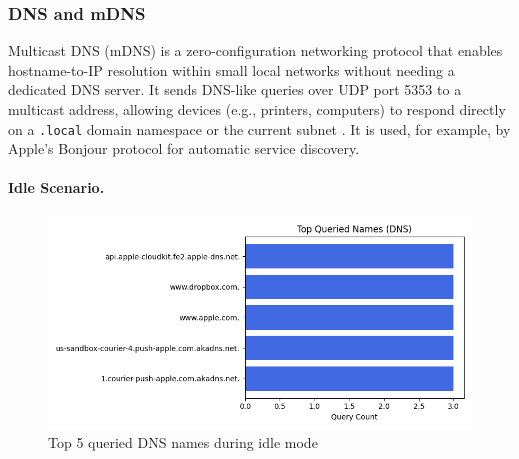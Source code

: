 \documentclass[sigconf,nonacm]{acmart}
\begin{document}

\subsubsection{DNS and mDNS}
\label{sec:dns_mdns_combined}

Multicast DNS (mDNS) is a zero-configuration networking protocol that enables hostname-to-IP resolution within small local networks without needing a dedicated DNS server. It sends DNS-like queries over UDP port 5353 to a multicast address, allowing devices (e.g., printers, computers) to respond directly on a \texttt{.local} domain namespace or the current subnet \cite{wikipedia:mdns}. It is used, for example, by Apple’s Bonjour protocol for automatic service discovery.

\paragraph{Idle Scenario.}

\begin{figure}[htbp]
    \centering
    \includegraphics[width=\columnwidth]{images/part2/idle/top_queried_names_dns.png}
    \caption{Top 5 queried DNS names during idle mode}
    \label{fig:dns_names_idle}
\end{figure}
\end{document}
